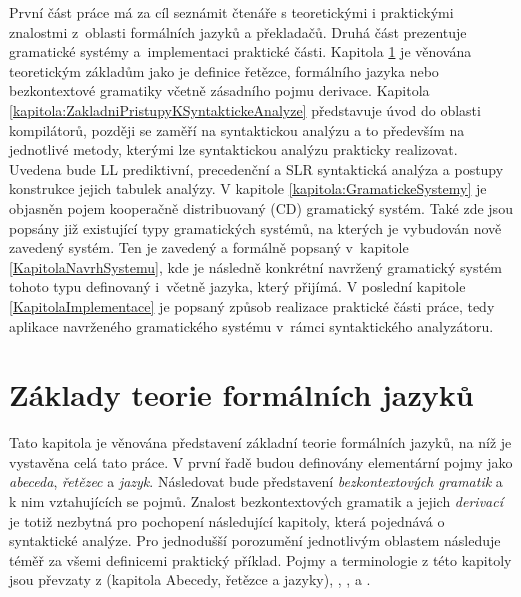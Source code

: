 První část práce má za cíl seznámit čtenáře s teoretickými i praktickými znalostmi z~oblasti formálních jazyků a překladačů.
Druhá část prezentuje gramatické systémy a~implementaci praktické části.
Kapitola \ref{kapitola:ZakladyTeorieFormalnichJazyku} je věnována teoretickým základům  jako je definice řetězce, formálního jazyka nebo bezkontextové
gramatiky včetně zásadního pojmu derivace. Kapitola \ref{kapitola:ZakladniPristupyKSyntaktickeAnalyze} představuje úvod do oblasti kompilátorů, později se zaměří na syntaktickou
analýzu a to především na jednotlivé metody, kterými lze syntaktickou analýzu prakticky realizovat. Uvedena bude LL prediktivní, precedenční a
SLR syntaktická analýza a postupy konstrukce jejich tabulek analýzy. V kapitole \ref{kapitola:GramatickeSystemy} je objasněn pojem
kooperačně distribuovaný (CD) gramatický systém. Také zde jsou popsány již existující typy gramatických systémů, na kterých je vybudován
nově zavedený systém. Ten je zavedený a formálně popsaný v~kapitole \ref{KapitolaNavrhSystemu}, kde je následně konkrétní navržený gramatický systém
tohoto typu definovaný i~včetně jazyka, který přijímá. V poslední kapitole \ref{KapitolaImplementace} je popsaný způsob realizace praktické
části práce, tedy aplikace navrženého gramatického systému v~rámci syntaktického analyzátoru.



\chapter{Základy teorie formálních jazyků} \label{kapitola:ZakladyTeorieFormalnichJazyku}
Tato kapitola je věnována představení základní teorie formálních jazyků, na níž je vystavěna celá tato práce. V první řadě budou definovány elementární
pojmy jako \emph{abeceda}, \emph{řetězec} a \emph{jazyk}. Následovat bude představení \emph{bezkontextových gramatik} a k nim vztahujících se pojmů. Znalost bezkontextových
gramatik a jejich \emph{derivací} je totiž nezbytná
pro pochopení následující kapitoly, která pojednává o syntaktické analýze.
Pro jednodušší porozumění jednotlivým oblastem následuje téměř za všemi definicemi praktický příklad. \linebreak Pojmy a terminologie z této kapitoly jsou převzaty z
\cite{IFJ:2017} (kapitola Abecedy, řetězce a jazyky), \cite{Meduna:2000:AutomataAndLanguages}, \cite{Meduna:2008:ElementsOfCompilerDesign}, \cite{Meduna:2014:FormalLanguagesAndComputation}
a \cite{Ceska:2020:TeoretickaInformatikaTIN}.

